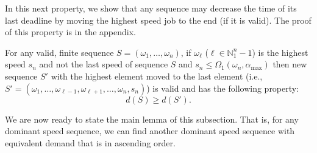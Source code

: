 
In this next property, we show that any sequence may decrease the time of its last deadline by moving the highest speed job to the end (if it is valid).  The proof of this property is in the appendix.

\begin{property}\label{prop:high-speed-transfer}
For any valid, finite sequence $S = (\omega_1, \ldots, \omega_n)$, if $\omega_\ell$ ($\ell \in \mathbb{N}_1^n-1$) is the highest speed $s_n$ and not the last speed of sequence $S$ and $s_n \leq \Omega_1(\omega_n,\alpha_{\max})$ then new sequence $S'$ with the highest element moved to the last element (i.e., $S' = (\omega_1, \ldots, \omega_{\ell-1}, \omega_{\ell+1}, \ldots, \omega_n, s_n)$) is valid and has the following property: 
\begin{equation}\label{eqn:high-speed-transfer}
    d(S) \geq d(S').
\end{equation}
\end{property}

We are now ready to state the main lemma of this subsection.  That is, for any dominant speed sequence, we can find another dominant speed sequence with equivalent demand that is in ascending order.

